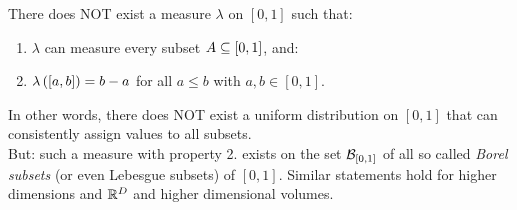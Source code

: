\begin{Thm}%
   \label{thm-non-lebesgue}
    There does NOT exist a measure $\lambda$ on $[0,1]$ such that:
    \begin{enumerate}
        \item $\lambda$ can measure every subset $A \subseteq [0,1]$, and:
        \item $\lambda\left ([a,b] \right ) = b-a$ for all $a\le b$ with $a,b \in [0,1]$.
    \end{enumerate}
    In other words, there does NOT exist a uniform distribution on $[0,1]$ that can consistently assign values to all subsets.\\
    But: such a measure with property 2. exists on the set $\mathcal{B}_{[0,1]}$ of all so called \emph{Borel subsets} (or even Lebesgue subsets) 
    of $[0,1]$.
    Similar statements hold for higher dimensions and $\mathbb{R}^D$ and higher dimensional volumes.
\end{Thm}


